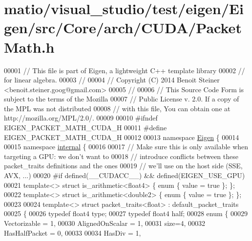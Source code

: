 \hypertarget{matio_2visual__studio_2test_2eigen_2_eigen_2src_2_core_2arch_2_c_u_d_a_2_packet_math_8h_source}{}\section{matio/visual\+\_\+studio/test/eigen/\+Eigen/src/\+Core/arch/\+C\+U\+D\+A/\+Packet\+Math.h}
\label{matio_2visual__studio_2test_2eigen_2_eigen_2src_2_core_2arch_2_c_u_d_a_2_packet_math_8h_source}

\begin{DoxyCode}
00001 \textcolor{comment}{// This file is part of Eigen, a lightweight C++ template library}
00002 \textcolor{comment}{// for linear algebra.}
00003 \textcolor{comment}{//}
00004 \textcolor{comment}{// Copyright (C) 2014 Benoit Steiner <benoit.steiner.goog@gmail.com>}
00005 \textcolor{comment}{//}
00006 \textcolor{comment}{// This Source Code Form is subject to the terms of the Mozilla}
00007 \textcolor{comment}{// Public License v. 2.0. If a copy of the MPL was not distributed}
00008 \textcolor{comment}{// with this file, You can obtain one at http://mozilla.org/MPL/2.0/.}
00009 
00010 \textcolor{preprocessor}{#ifndef EIGEN\_PACKET\_MATH\_CUDA\_H}
00011 \textcolor{preprocessor}{#define EIGEN\_PACKET\_MATH\_CUDA\_H}
00012 
00013 \textcolor{keyword}{namespace }\hyperlink{namespace_eigen}{Eigen} \{
00014 
00015 \textcolor{keyword}{namespace }\hyperlink{namespaceinternal}{internal} \{
00016 
00017 \textcolor{comment}{// Make sure this is only available when targeting a GPU: we don't want to}
00018 \textcolor{comment}{// introduce conflicts between these packet\_traits definitions and the ones}
00019 \textcolor{comment}{// we'll use on the host side (SSE, AVX, ...)}
00020 \textcolor{preprocessor}{#if defined(\_\_CUDACC\_\_) && defined(EIGEN\_USE\_GPU)}
00021 \textcolor{keyword}{template}<> \textcolor{keyword}{struct }is\_arithmetic<float4>  \{ \textcolor{keyword}{enum} \{ value = \textcolor{keyword}{true} \}; \};
00022 \textcolor{keyword}{template}<> \textcolor{keyword}{struct }is\_arithmetic<double2> \{ \textcolor{keyword}{enum} \{ value = \textcolor{keyword}{true} \}; \};
00023 
00024 \textcolor{keyword}{template}<> \textcolor{keyword}{struct }packet\_traits<float> : default\_packet\_traits
00025 \{
00026   \textcolor{keyword}{typedef} float4 type;
00027   \textcolor{keyword}{typedef} float4 half;
00028   \textcolor{keyword}{enum} \{
00029     Vectorizable = 1,
00030     AlignedOnScalar = 1,
00031     size=4,
00032     HasHalfPacket = 0,
00033 
00034     HasDiv  = 1,

\end{DoxyCode}
